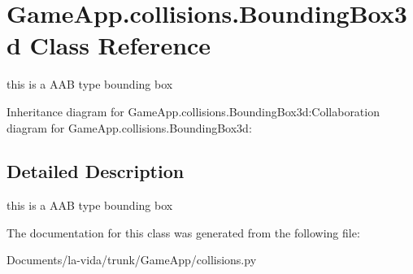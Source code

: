 \hypertarget{classGameApp_1_1collisions_1_1BoundingBox3d}{
\section{GameApp.collisions.BoundingBox3d Class Reference}
\label{classGameApp_1_1collisions_1_1BoundingBox3d}
}
this is a AAB type bounding box  


Inheritance diagram for GameApp.collisions.BoundingBox3d:Collaboration diagram for GameApp.collisions.BoundingBox3d:

\subsection{Detailed Description}
this is a AAB type bounding box 

The documentation for this class was generated from the following file:\begin{CompactItemize}
\item 
Documents/la-vida/trunk/GameApp/collisions.py\end{CompactItemize}
